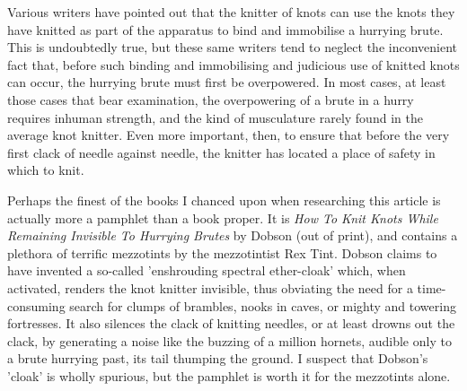 Various writers have pointed out that the knitter of knots can use the knots they have knitted as part of the apparatus to bind and immobilise a hurrying brute. This is undoubtedly true, but these same writers tend to neglect the inconvenient fact that, before such binding and immobilising and judicious use of knitted knots can occur, the hurrying brute must first be overpowered. In most cases, at least those cases that bear examination, the overpowering of a brute in a hurry requires inhuman strength, and the kind of musculature rarely found in the average knot knitter. Even more important, then, to ensure that before the very first clack of needle against needle, the knitter has located a place of safety in which to knit.

Perhaps the finest of the books I chanced upon when researching this article is actually more a pamphlet than a book proper. It is \emph{How To Knit Knots While Remaining Invisible To Hurrying Brutes} by Dobson (out of print), and contains a plethora of terrific mezzotints by the mezzotintist Rex Tint. Dobson claims to have invented a so-called 'enshrouding spectral ether-cloak' which, when activated, renders the knot knitter invisible, thus obviating the need for a time-consuming search for clumps of brambles, nooks in caves, or mighty and towering fortresses. It also silences the clack of knitting needles, or at least drowns out the clack, by generating a noise like the buzzing of a million hornets, audible only to a brute hurrying past, its tail thumping the ground. I suspect that Dobson's 'cloak' is wholly spurious, but the pamphlet is worth it for the mezzotints alone.